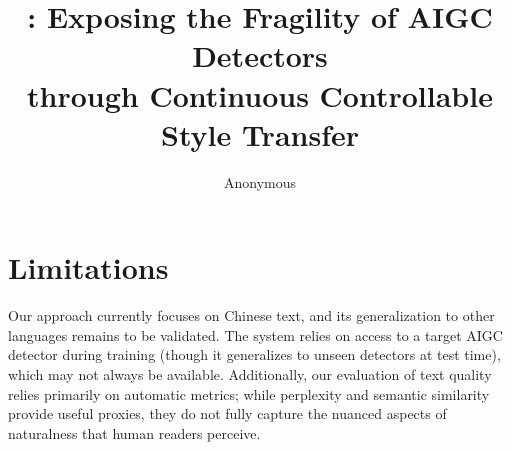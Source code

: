 \documentclass[11pt]{article}
\title{\styleshield{}: Exposing the Fragility of AIGC Detectors \\
through Continuous Controllable Style Transfer}
\author{Anonymous}
\begin{document}
\maketitle









\section*{Limitations}
Our approach currently focuses on Chinese text, and its generalization to other languages remains to be validated.
The system relies on access to a target AIGC detector during training (though it generalizes to unseen detectors at test time), which may not always be available.
Additionally, our evaluation of text quality relies primarily on automatic metrics; while perplexity and semantic similarity provide useful proxies, they do not fully capture the nuanced aspects of naturalness that human readers perceive.





\appendix

\end{document}

